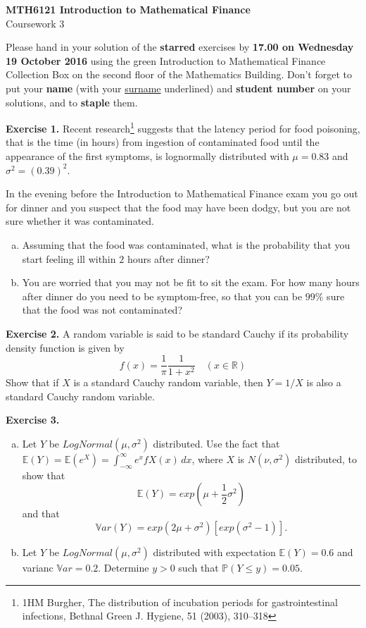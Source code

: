 \documentclass[11pt,a4paper]{report}
\begin{document}
\begin{center}
	\LARGE\textbf{MTH6121 Introduction to Mathematical Finance}\\
	Coursework 3
\end{center}

Please hand in your solution of the \textbf{starred} exercises by \textbf{17.00 on Wednesday 19 October 2016} using the green Introduction to Mathematical Finance Collection Box on the second floor of the Mathematics Building. Don’t forget to put your \textbf{name} (with your \underline{surname} underlined) and \textbf{student number} on your solutions, and to \textbf{staple} them.

\textbf{Exercise 1.} Recent research\footnote{1HM Burgher, The distribution of incubation periods for gastrointestinal infections, Bethnal Green J. Hygiene, 51 (2003), 310–318} suggests that the latency period for food poisoning, that is the time (in hours) from ingestion of contaminated food until the appearance of the first symptoms, is lognormally distributed with $\mu = 0.83$ and $\sigma^2 = (0.39)^2$.\par
In the evening before the Introduction to Mathematical Finance exam you go out for dinner and you suspect that the food may have been dodgy, but you are not sure whether it was contaminated.

\begin{enumerate}[(a)]
	\item Assuming that the food was contaminated, what is the probability that you start feeling ill within $2$ hours after dinner?
	\item You are worried that you may not be fit to sit the exam. For how many hours after dinner do you need to be symptom-free, so that you can be $99\%$ sure that the food was not contaminated?
\end{enumerate}

\textbf{Exercise 2.} A random variable is said to be standard Cauchy if its probability density function is given by $$f(x) = \frac{1}{\pi}\frac{1}{1+x^2}\quad (x\in\mathbb{R})$$ Show that if $X$ is a standard Cauchy random variable, then $Y = 1/X$ is also a standard Cauchy random variable.

\textbf{Exercise 3.}

\begin{enumerate}[(a)]
	\item Let $Y$ be $LogNormal(\mu,\sigma^2)$ distributed. Use the fact that $\mathbb{E}(Y) = \mathbb{E}(e^X) = \int_{-\infty}^\infty e^xfX(x)\,dx$, where $X$ is $N(\nu, \sigma^2)$ distributed, to show that $$\mathbb{E}(Y)=exp\left(\mu+\frac{1}{2}\sigma^2\right)$$ and that $$\mathbb{V}ar(Y) = exp(2\mu+\sigma^2)[exp(\sigma^2-1)].$$
	\item Let $Y$ be $LogNormal(\mu,\sigma^2)$ distributed with expectation $\mathbb{E}(Y) = 0.6$ and  varianc $\mathbb{V}ar = 0.2$. Determine $y>0$ such that $\mathbb{P}(Y \leq y) = 0.05$.
\end{enumerate}
\end{document}
